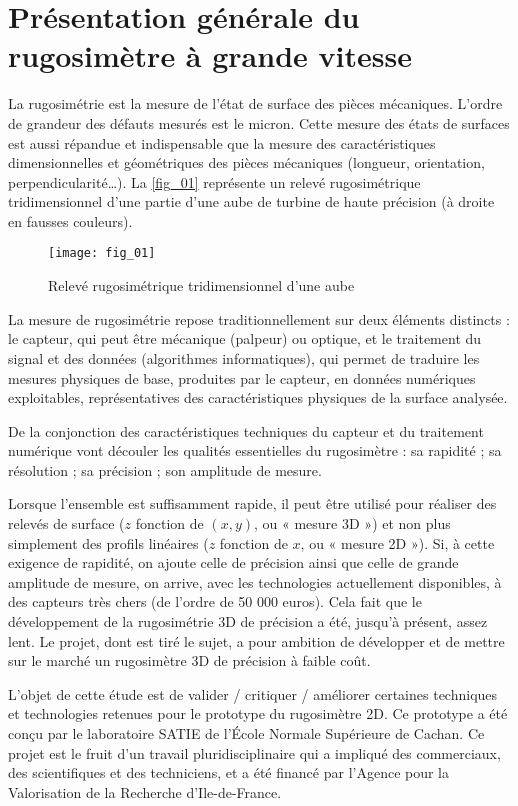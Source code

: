 
\section{Présentation générale du rugosimètre à grande vitesse}

La rugosimétrie est la mesure de l’état de surface des pièces mécaniques. L’ordre de grandeur des défauts
mesurés est le micron. Cette mesure des états de surfaces est aussi répandue et indispensable que la mesure
des caractéristiques dimensionnelles et géométriques des pièces mécaniques (longueur, orientation,
perpendicularité…). La \autoref{fig_01} représente un relevé rugosimétrique tridimensionnel d’une partie d’une
aube de turbine de haute précision (à droite en fausses couleurs).


\begin{figure}[H]
\centering
\texttt{[image: fig\_01]}
\caption{\label{fig_01} Relevé rugosimétrique tridimensionnel d’une aube}
\end{figure}

La mesure de rugosimétrie repose traditionnellement sur deux éléments distincts : le capteur, qui peut être
mécanique (palpeur) ou optique, et le traitement du signal et des données (algorithmes informatiques), qui
permet de traduire les mesures physiques de base, produites par le capteur, en données numériques
exploitables, représentatives des caractéristiques physiques de la surface analysée.


De la conjonction des caractéristiques techniques du capteur et du traitement numérique vont découler les
qualités essentielles du rugosimètre : sa rapidité ; sa résolution ; sa précision ; son amplitude de mesure.

Lorsque l’ensemble est suffisamment rapide, il peut être utilisé pour réaliser des relevés de surface
($z$ fonction de $(x, y)$, ou « mesure 3D ») et non plus simplement des profils linéaires ($z$ fonction de $x$, ou
« mesure 2D »). Si, à cette exigence de rapidité, on ajoute celle de précision ainsi que celle de grande
amplitude de mesure, on arrive, avec les technologies actuellement disponibles, à des capteurs très chers
(de l’ordre de 50 000 euros). Cela fait que le développement de la rugosimétrie 3D de précision a été,
jusqu'à présent, assez lent. Le projet, dont est tiré le sujet, a pour ambition de développer et de mettre sur le
marché un rugosimètre 3D de précision à faible coût.

L’objet de cette étude est de valider / critiquer / améliorer certaines techniques et technologies retenues
pour le prototype du rugosimètre 2D. Ce prototype a été conçu par le laboratoire SATIE de l’École
Normale Supérieure de Cachan. Ce projet est le fruit d’un travail pluridisciplinaire qui a impliqué des
commerciaux, des scientifiques et des techniciens, et a été financé par l’Agence pour la Valorisation de la
Recherche d’Ile-de-France.

